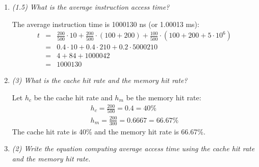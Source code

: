 \documentclass[letterpaper,11pt]{article}
\begin{document}
\begin{enumerate}
  \begin{enumerate}
    \item \emph{(1.5) What is the average instruction access time?}

    The average instruction time is 1000130 ns (or 1.00013 ms):
    \begin{eqnarray*}
    t &=& \frac{200}{500}\cdot10 + \frac{200}{500}\cdot(100 + 200) + \frac{100}{500}\cdot(100 + 200 + 5\cdot10^6) \\
    &=& 0.4\cdot10 + 0.4\cdot210 + 0.2\cdot5000210 \\
    &=& 4 + 84 + 1000042 \\
    &=& 1000130
    \end{eqnarray*}
    \item \emph{(3) What is the cache hit rate and the memory hit rate?}
    
    Let $h_c$ be the cache hit rate and $h_m$ be the memory hit rate:
    \begin{eqnarray*}
    h_c = \frac{200}{500} = 0.4 = 40\% \\
    h_m = \frac{200}{300} = 0.6667 = 66.67\%%
    \end{eqnarray*}    
    The cache hit rate is 40\% and the memory hit rate is 66.67\%.
    \item \emph{(2) Write the equation computing average access time using the cache hit rate and the memory hit rate.}
    

\end{enumerate}
\end{enumerate}
\end{document}
